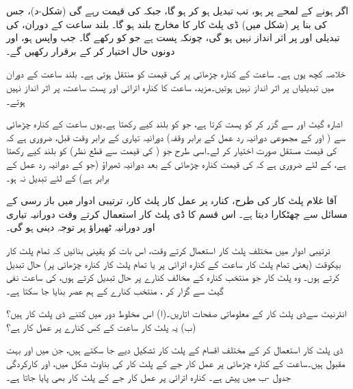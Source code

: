  اگر  ہونے کے لمحے پر  ہو، تب  تبدیل ہو کر  ہو گا، جبکہ  کی قیمت  رہے گی (شکل-د)، جس کی بنا پر (شکل  میں) ڈی پلٹ کار کا مخارج  بلند  ہو گا۔ بلند ساعت  کے دوران،  کی تبدیلی  اور  پر اثر انداز نہیں ہو گی، چونکہ  پست  ہے جو  کو  رکھے گا۔ جب  واپس  ہو،  اور  دونوں  حال اختیار کر کے  برقرار رکھیں گے۔
 
 خلاصہ کچھ یوں ہے۔ ساعت کے کنارہ چڑھائی پر  کی قیمت  کو منتقل ہوتی ہے۔ بلند ساعت کے دوران  میں تبدیلیاں  پر اثر انداز نہیں ہوتیں۔مزید، ساعت کا کنارہ اترائی اور پست ساعت،  پر اثر انداز نہیں ہوتے۔
 
 اشارہ  گیٹ  اور  سے گزر کر  کو پست کرتا ہے، جو  کو بلند کیے رکھتا ہے۔یوں ساعت کے کنارہ چڑھائی سے ( اور  کے مجموعی دورانیہ رد عمل کے برابر وقفہ) دورانیہ تیاری کے برابر وقت قبل، ضروری ہے کہ کی قیمت مستقل صورت اختیار کر لے۔اسی طرح  جو ( کی قیمت سے قطع نظر)  کو بلند کیے رکھتا ہے، کے لئے ضروری ہے کہ  کی قیمت کنارہ چڑھائی کے بعد دورانیہ ٹھیراؤ (جو  کے دورانیہ رد عمل کے برابر ہے) کے لئے تبدیل نہ ہو۔
 
 آقا غلام پلٹ کار کی طرح، کنارہ پر عمل کار پلٹ کار، ترتیبی ادوار میں باز رسی کے مسائل سے چھٹکارا دیتا ہے۔ اس قسم کا ڈی پلٹ کار استعمال کرتے وقت دورانیہ تیاری اور دورانیہ ٹھیراؤ پر توجہ دینی ہو گی۔ 

ترتیبی ادوار میں مختلف پلٹ کار استعمال کرتے وقت، اس بات کو یقینی بنائیں کہ تمام پلٹ کار بیکوقت (یعنی تمام پلٹ کار ساعت کے کنارہ اترائی پر یا تمام پلٹ کار کنارہ چڑھائی پر) حال تبدیل کرتے ہوں۔ وہ پلٹ کار جو منتخب کنارہ کے مخالف کنارے پر حال تبدیل کرتے ہوں، کی ساعت نفی گیٹ سے گزار کر ، منتخب کنارے کے ہم عصر بنایا جا سکتا ہے۔


انٹرنیٹ سےڈی پلٹ کار کے معلوماتی صفحات اتاریں۔(ا) اس مخلوط دور میں کتنے ڈی پلٹ کار ہیں؟ (ب) یہ پلٹ کار ساعت کے کس کنارے پر عمل کار ہے؟


ڈی پلٹ کار استعمال کر کے مختلف اقسام کے پلٹ کار تشکیل دیے جا سکتے ہیں، جن میں  اور  بہت مقبول ہیں۔ساعت کے کنارہ چڑھائی پر عمل کار جے کے پلٹ کار کی بناوٹ شکل  میں، اور کارکردگی جدول -ب میں پیش ہے۔ کنارہ اترائی پر عمل کار جے کے پلٹ کار بھی پایا جاتا ہے۔

